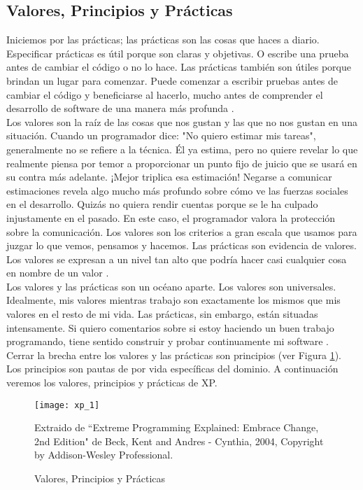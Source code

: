 \begin{spacing}{1.5}
	\subsection{Valores, Principios y Pr\'{a}cticas}
		Iniciemos por las pr\'{a}cticas; las prácticas son las cosas que haces a diario. Especificar prácticas es útil porque son claras y objetivas. O escribe una prueba antes de cambiar el código o no lo hace. Las prácticas también son útiles porque brindan un lugar para comenzar. Puede comenzar a escribir pruebas antes de cambiar el código y beneficiarse al hacerlo, mucho antes de comprender el desarrollo de software de una manera más profunda \cite{chap2_extreme_programming}.\\
		Los valores son la raíz de las cosas que nos gustan y las que no nos gustan en una situación. Cuando un programador dice: "No quiero estimar mis tareas", generalmente no se refiere a la técnica. Él ya estima, pero no quiere revelar lo que realmente piensa por temor a proporcionar un punto fijo de juicio que se usará en su contra más adelante. ¡Mejor triplica esa estimación! Negarse a comunicar estimaciones revela algo mucho más profundo sobre cómo ve las fuerzas sociales en el desarrollo. Quizás no quiera rendir cuentas porque se le ha culpado injustamente en el pasado. En este caso, el programador valora la protección sobre la comunicación. Los valores son los criterios a gran escala que usamos para juzgar lo que vemos, pensamos y hacemos. Las prácticas son evidencia de valores. Los valores se expresan a un nivel tan alto que podría hacer casi cualquier cosa en nombre de un valor \cite{chap2_extreme_programming}.\\
		Los valores y las prácticas son un océano aparte. Los valores son universales. Idealmente, mis valores mientras trabajo son exactamente los mismos que mis valores en el resto de mi vida. Las prácticas, sin embargo, están situadas intensamente. Si quiero comentarios sobre si estoy haciendo un buen trabajo programando, tiene sentido construir y probar continuamente mi software \cite{chap2_extreme_programming}.
		Cerrar la brecha entre los valores y las prácticas son principios (ver Figura \ref{figure:chaperII_2}). Los principios son pautas de por vida específicas del dominio. A continuaci\'{o}n veremos los valores, principios y prácticas de XP.
		\begin{figure}[H]
			\texttt{[image: xp\_1]}
			\caption {\centering \small{Valores, Principios y Pr\'{a}cticas}} \label{figure:chaperII_2}
			\small {Extraido de ``Extreme Programming Explained: Embrace Change, 2nd Edition" de Beck, Kent and Andres - Cynthia, 2004, Copyright by Addison-Wesley Professional.}
		\end{figure}
		

\end{spacing}
